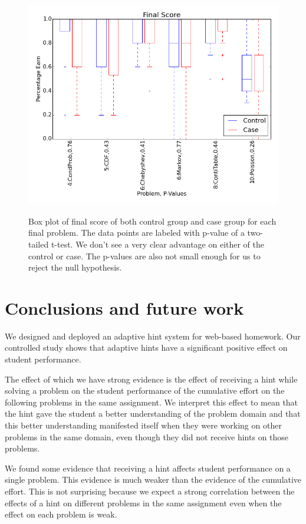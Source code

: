 \documentclass{llncs2e/llncs}
\begin{document}
\begin{figure}
\centering
\caption{Box plot of final score of both control group and case group for each final problem. The data points are labeled with p-value of a two-tailed t-test. We don't see a very clear advantage on either of the control or case. The p-values are also not small enough for us to reject the null hypothesis.}
\includegraphics[width=0.9\linewidth]{image/final_boxPlot.png}
\label{fig:final_compare_all}
\end{figure}
\fi


\section{Conclusions and future work}

We designed and deployed an adaptive hint system for web-based homework. Our controlled study shows that adaptive hints have a significant positive effect on student performance.

The effect of which we have strong evidence is the effect of receiving a hint while solving a problem on the student performance of the cumulative effort on the following problems in the same assignment. We interpret this effect to mean that the hint gave the student a better understanding of the problem domain and that this better understanding manifested itself when they were working on other problems in the same domain, even though they did not receive hints on those problems.

We found some evidence that receiving a hint affects student
performance on a single problem. This evidence is much weaker than the evidence of the cumulative effort. This is not surprising because we expect a strong correlation between the effects of a hint on different problems in the same assignment even when the effect on each problem is weak.
\end{document}
